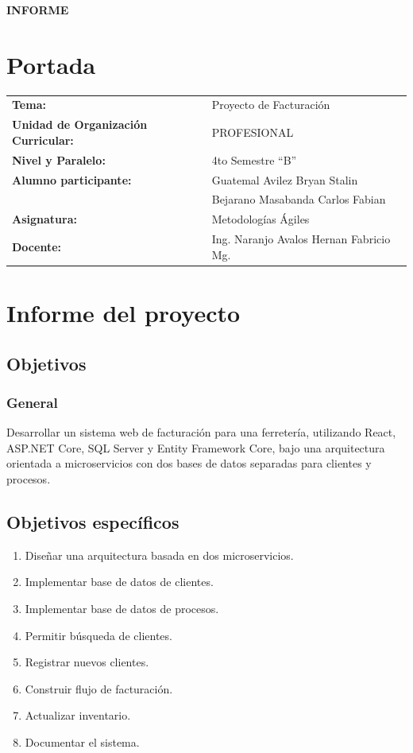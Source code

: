 \documentclass[12pt]{article}
\begin{document}
\begin{center}
    {\large \textbf{INFORME}}\\
\end{center}

\section{Portada}
\begin{flushleft}
\begin{tabular}{p{6.2cm} p{8.5cm}}
\textbf{Tema:} & Proyecto de Facturación \\
\textbf{Unidad de Organización Curricular:} & PROFESIONAL \\
\textbf{Nivel y Paralelo:} & 4to Semestre ``B'' \\
\textbf{Alumno participante:} & Guatemal Avilez Bryan Stalin \\
& Bejarano Masabanda Carlos Fabian \\
\textbf{Asignatura:} & Metodologías Ágiles \\
\textbf{Docente:} & Ing. Naranjo Avalos Hernan Fabricio Mg. \\
\end{tabular}
\end{flushleft}

\section{Informe del proyecto}

\subsection{Objetivos}

\subsubsection{General}
Desarrollar un sistema web de facturación para una ferretería, utilizando React, ASP.NET Core, SQL Server y Entity Framework Core, 
bajo una arquitectura orientada a microservicios con dos bases de datos separadas para clientes y procesos.

\subsection{Objetivos específicos}
\begin{enumerate}
\item Diseñar una arquitectura basada en dos microservicios.
\item Implementar base de datos de clientes.
\item Implementar base de datos de procesos.
\item Permitir búsqueda de clientes.
\item Registrar nuevos clientes.
\item Construir flujo de facturación.
\item Actualizar inventario.
\item Documentar el sistema.
\end{enumerate}
\end{document}

